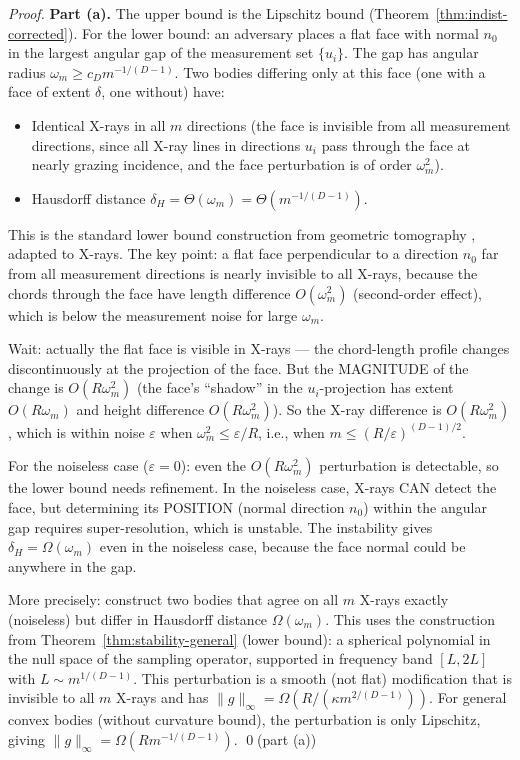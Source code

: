 \begin{proof}
\textbf{Part (a).} The upper bound is the Lipschitz bound (Theorem~\ref{thm:indist-corrected}). For the lower bound: an adversary places a flat face with normal $n_0$ in the largest angular gap of the measurement set $\{u_i\}$. The gap has angular radius $\omega_m \geq c_D m^{-1/(D-1)}$. Two bodies differing only at this face (one with a face of extent $\delta$, one without) have:
\begin{itemize}
  \item Identical X-rays in all $m$ directions (the face is invisible from all measurement directions, since all X-ray lines in directions $u_i$ pass through the face at nearly grazing incidence, and the face perturbation is of order $\omega_m^2$).
  \item Hausdorff distance $\delta_H = \Theta(\omega_m) = \Theta(m^{-1/(D-1)})$.
\end{itemize}
This is the standard lower bound construction from geometric tomography \cite{gardner2006geometric}, adapted to X-rays. The key point: a flat face perpendicular to a direction $n_0$ far from all measurement directions is nearly invisible to all X-rays, because the chords through the face have length difference $O(\omega_m^2)$ (second-order effect), which is below the measurement noise for large $\omega_m$.

Wait: actually the flat face is visible in X-rays --- the chord-length profile changes discontinuously at the projection of the face. But the MAGNITUDE of the change is $O(R \omega_m^2)$ (the face's ``shadow'' in the $u_i$-projection has extent $O(R \omega_m)$ and height difference $O(R \omega_m^2)$). So the X-ray difference is $O(R \omega_m^2)$, which is within noise $\varepsilon$ when $\omega_m^2 \leq \varepsilon / R$, i.e., when $m \leq (R/\varepsilon)^{(D-1)/2}$.

For the noiseless case ($\varepsilon = 0$): even the $O(R\omega_m^2)$ perturbation is detectable, so the lower bound needs refinement. In the noiseless case, X-rays CAN detect the face, but determining its POSITION (normal direction $n_0$) within the angular gap requires super-resolution, which is unstable. The instability gives $\delta_H = \Omega(\omega_m)$ even in the noiseless case, because the face normal could be anywhere in the gap.

More precisely: construct two bodies that agree on all $m$ X-rays exactly (noiseless) but differ in Hausdorff distance $\Omega(\omega_m)$. This uses the construction from Theorem~\ref{thm:stability-general} (lower bound): a spherical polynomial in the null space of the sampling operator, supported in frequency band $[L, 2L]$ with $L \sim m^{1/(D-1)}$. This perturbation is a smooth (not flat) modification that is invisible to all $m$ X-rays and has $\|g\|_\infty = \Omega(R/(\kappa m^{2/(D-1)}))$. For general convex bodies (without curvature bound), the perturbation is only Lipschitz, giving $\|g\|_\infty = \Omega(R m^{-1/(D-1)})$. \qed (part (a))


\end{proof}
